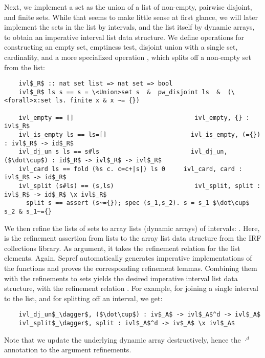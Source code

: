 \documentclass[sn-mathphys,Numbered]{sn-jnl}
\theoremstyle{thmstyleone}%
\theoremstyle{definition}%
\theoremstyle{thmstylethree}%
\begin{document}
  Next, we implement a set as the union of a list of non-empty, pairwise disjoint, and finite sets.
  While that seems to make little sense at first glance, we will later implement the sets in the list by intervals,
  and the list itself by dynamic arrays, to obtain an imperative interval list data structure.
  We define operations for constructing an empty set, emptiness test,
  disjoint union with a single set, cardinality, and a more specialized operation , which splits off
  a non-empty set from the list:
  \begin{lstlisting}
    ivl$_R$ :: nat set list => nat set => bool
    ivl$_R$ ls s == s = \<Union>set s  &  pw_disjoint ls  &  (\<forall>x:set ls. finite x & x ~= {})

    ivl_empty == []                                 ivl_empty, {} : ivl$_R$
    ivl_is_empty ls == ls=[]                       ivl_is_empty, (={}) : ivl$_R$ -> id$_R$
    ivl_dj_un s ls == s#ls                         ivl_dj_un, ($\dot\cup$) : id$_R$ -> ivl$_R$ -> ivl$_R$
    ivl_card ls == fold (%s c. c=c+|s|) ls 0     ivl_card, card : ivl$_R$ -> id$_R$
    ivl_split (s#ls) == (s,ls)                      ivl_split, split : ivl$_R$ -> id$_R$ \x ivl$_R$
      split s == assert (s~={}); spec (s_1,s_2). s = s_1 $\dot\cup$ s_2 & s_1~={}
  \end{lstlisting}

  We then refine the lists of sets to array lists (dynamic arrays) of intervals: .
  Here,  is the refinement assertion from lists to the array list data structure from the IRF collections library.
  As argument, it takes the refinement relation for the list elements.
  Again, Sepref automatically generates imperative implementations of the  functions and proves the corresponding
  refinement lemmas. Combining them with the refinements to sets yields the desired imperative interval list data structure,
  with the refinement relation .
  For example, for joining a single interval to the list, and for splitting off an interval, we get:
  \begin{lstlisting}
    ivl_dj_un$_\dagger$, ($\dot\cup$) : iv$_A$ -> ivl$_A$^d -> ivl$_A$
    ivl_split$_\dagger$, split : ivl$_A$^d -> iv$_A$ \x ivl$_A$
  \end{lstlisting}
  Note that we update the underlying dynamic array destructively, hence the $\cdot^d$ annotation to the argument refinements.
\end{document}

